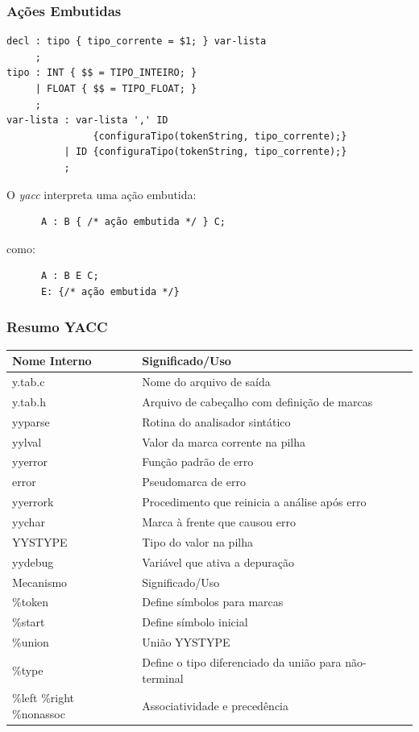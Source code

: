 \documentclass[table]{beamer}
\begin{document}
\begin{frame}[fragile]
   \frametitle{Ações Embutidas}
   \small
   \begin{verbatim}
decl : tipo { tipo_corrente = $1; } var-lista
     ;
tipo : INT { $$ = TIPO_INTEIRO; }
     | FLOAT { $$ = TIPO_FLOAT; }
     ;
var-lista : var-lista ',' ID  
               {configuraTipo(tokenString, tipo_corrente);}
          | ID {configuraTipo(tokenString, tipo_corrente);}
          ;    
   \end{verbatim}
   O \textit{yacc} interpreta uma ação embutida:
   \begin{verbatim}
      A : B { /* ação embutida */ } C;
   \end{verbatim}
   como:
   \begin{verbatim}
      A : B E C;
      E: {/* ação embutida */}
   \end{verbatim}
\end{frame}

\begin{frame}
   \frametitle{Resumo YACC}
   \footnotesize
   \begin{table}
      \begin{tabular}{ll}
      \hline
Nome Interno & Significado/Uso \\
      \hline
y.tab.c & Nome do arquivo de saída \\
y.tab.h & Arquivo de cabeçalho com definição de marcas \\
yyparse & Rotina do analisador sintático \\
yylval & Valor da marca corrente na pilha \\
yyerror & Função padrão de erro \\
error & Pseudomarca de erro \\
yyerrork & Procedimento que reinicia a análise após erro \\
yychar & Marca à frente que causou erro \\
YYSTYPE & Tipo do valor na pilha \\
yydebug & Variável que ativa a depuração \\
\hline
Mecanismo & Significado/Uso \\
\hline
\%token & Define símbolos para marcas \\
\%start & Define símbolo inicial \\
\%union & União YYSTYPE \\
\%type & Define o tipo diferenciado da união para não-terminal \\
\%left \%right \%nonassoc & Associatividade e precedência \\
      \end{tabular}
   \end{table}
\end{frame}
\end{document}
